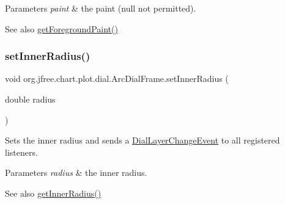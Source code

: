 \begin{DoxyParams}{Parameters}
{\em paint} & the paint ({\ttfamily null} not permitted).\\
\hline
\end{DoxyParams}
\begin{DoxySeeAlso}{See also}
\mbox{\hyperlink{classorg_1_1jfree_1_1chart_1_1plot_1_1dial_1_1_arc_dial_frame_a918c4dd5e80bc020ee7491ade8bf874a}{get\+Foreground\+Paint()}} 
\end{DoxySeeAlso}
\mbox{\label{classorg_1_1jfree_1_1chart_1_1plot_1_1dial_1_1_arc_dial_frame_a08db4e0ceed0203c47767b810a199e0b}} 
\subsubsection{\texorpdfstring{set\+Inner\+Radius()}{setInnerRadius()}}
{\footnotesize\ttfamily void org.\+jfree.\+chart.\+plot.\+dial.\+Arc\+Dial\+Frame.\+set\+Inner\+Radius (\begin{DoxyParamCaption}\item[{double}]{radius }\end{DoxyParamCaption})}

Sets the inner radius and sends a \mbox{\hyperlink{classorg_1_1jfree_1_1chart_1_1plot_1_1dial_1_1_dial_layer_change_event}{Dial\+Layer\+Change\+Event}} to all registered listeners.


\begin{DoxyParams}{Parameters}
{\em radius} & the inner radius.\\
\hline
\end{DoxyParams}
\begin{DoxySeeAlso}{See also}
\mbox{\hyperlink{classorg_1_1jfree_1_1chart_1_1plot_1_1dial_1_1_arc_dial_frame_abb7997fb0e86fb41d6e760b230b71a24}{get\+Inner\+Radius()}} 
\end{DoxySeeAlso}
\mbox{\label{classorg_1_1jfree_1_1chart_1_1plot_1_1dial_1_1_arc_dial_frame_a67c4b353c0c1e5d7cbd4b230d0df688c}} 
